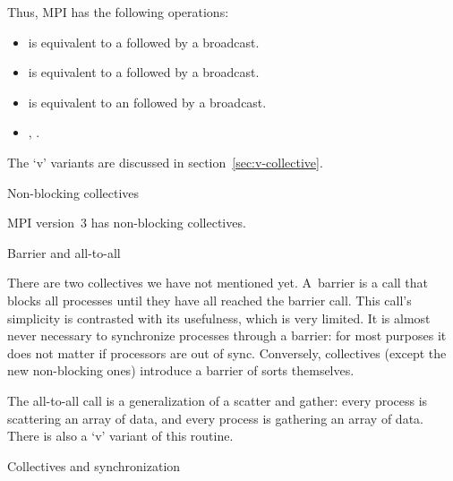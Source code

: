 Thus, MPI has the following operations:
\begin{itemize}
\item {} is equivalent to a  followed by a broadcast.
\item {} is equivalent to a  followed by a broadcast.
\item {} is equivalent to an  followed by a broadcast.
\item {}, .
\end{itemize}
The `v' variants are discussed in section~\ref{sec:v-collective}.

 {Non-blocking collectives}
\label{sec:mpi3collect}

MPI version~3 has non-blocking collectives.

 {Barrier and all-to-all}

There are two collectives we have not mentioned yet. A~barrier is a
call that blocks all processes until they have all reached the barrier
call. This call's simplicity is contrasted with its usefulness, which
is very limited. It is almost never necessary to synchronize processes
through a barrier: for most purposes it does not matter if processors
are out of sync. Conversely, collectives (except the new non-blocking
ones) introduce a barrier of sorts themselves.

The all-to-all call is a generalization of a scatter and gather: every
process is scattering an array of data, and every process is gathering
an array of data. There is also a `v' variant of this routine.

 {Collectives and synchronization}


